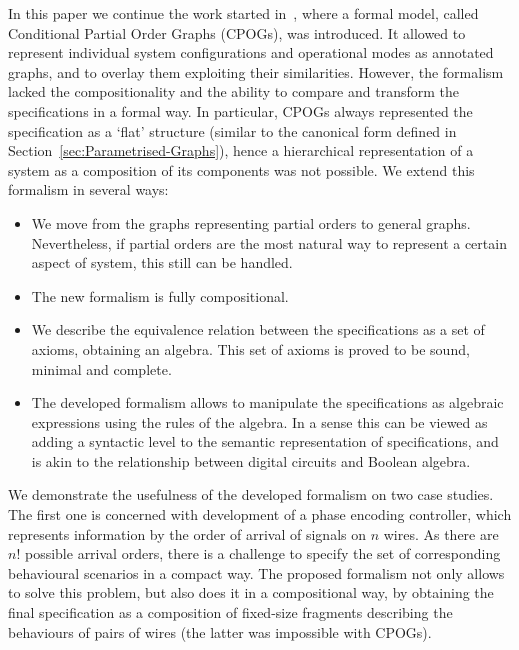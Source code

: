 In this paper we continue the work started in~\cite{2010_mokhov_ieee},
where a formal model, called Conditional Partial Order Graphs (CPOGs),
was introduced. It allowed to represent individual system configurations
and operational modes as annotated graphs, and to overlay them exploiting
their similarities. However, the formalism lacked the compositionality
and the ability to compare and transform the specifications in a formal
way. In particular, CPOGs always represented the specification as
a `flat' structure (similar to the canonical form defined in Section~\ref{sec:Parametrised-Graphs}),
hence a hierarchical representation of a system as a composition of
its components was not possible. We extend this formalism in several
ways:
\begin{itemize}
\item We move from the graphs representing partial orders to general graphs.
Nevertheless, if partial orders are the most natural way to represent
a certain aspect of system, this still can be handled.
\item The new formalism is fully compositional.
\item We describe the equivalence relation between the specifications as
a set of axioms, obtaining an algebra. This set of axioms is proved
to be sound, minimal and complete.
\item The developed formalism allows to manipulate the specifications as
algebraic expressions using the rules of the algebra. In a sense this
can be viewed as adding a syntactic level to the semantic representation
of specifications, and is akin to the relationship between digital
circuits and Boolean algebra.
\end{itemize}
We demonstrate the usefulness of the developed formalism on two case
studies. The first one is concerned with development of a phase encoding
controller, which represents information by the order of arrival of
signals on $n$ wires. As there are $n!$ possible arrival orders,
there is a challenge to specify the set of corresponding behavioural
scenarios in a compact way. The proposed formalism not only allows
to solve this problem, but also does it in a compositional way, by
obtaining the final specification as a composition of fixed-size fragments
describing the behaviours of pairs of wires (the latter was impossible
with CPOGs).

